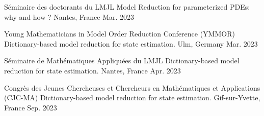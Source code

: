 

\begin{cvpresentations}



\cvpresentation
{S\'eminaire des doctorants du LMJL} %
{Model Reduction for parameterized PDEs: why and how ?} %
{Nantes, France} %
{Mar. 2023} %


\cvpresentation
{Young Mathematicians in Model Order Reduction Conference (YMMOR)} %
{Dictionary-based model reduction for state estimation.} %
{Ulm, Germany} %
{Mar. 2023} %


\cvpresentation
{S\'eminaire de Mathématiques Appliquées du LMJL} %
{Dictionary-based model reduction for state estimation.} %
{Nantes, France} %
{Apr. 2023} %


\cvpresentation
{Congr\`es des Jeunes Chercheuses et Chercheurs en Mathématiques et Applications (CJC-MA)} %
{Dictionary-based model reduction for state estimation.} %
{Gif-sur-Yvette, France} %
{Sep. 2023} %

\end{cvpresentations}
